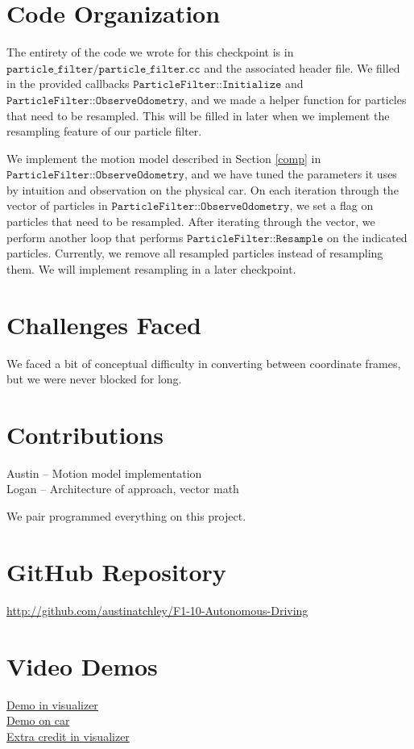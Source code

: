 \section{Code Organization}
The entirety of the code we wrote for this checkpoint is in $\texttt{particle\_filter/particle\_filter.cc}$ and the associated header file. We filled in the provided callbacks $\texttt{ParticleFilter::Initialize}$ and
$\texttt{ParticleFilter::ObserveOdometry}$, and we made a helper function for particles that need to be resampled. This will be filled in later when we implement the resampling feature of our particle filter.

We implement the motion model described in Section \ref{comp} in $\texttt{ParticleFilter::ObserveOdometry}$, and we have tuned the parameters it uses by intuition and observation on the physical car. On each iteration through the vector of particles in $\texttt{ParticleFilter::ObserveOdometry}$, we set a flag on particles that need to be resampled. After iterating through the vector, we perform another loop that performs $\texttt{ParticleFilter::Resample}$ on the indicated particles. Currently, we remove all resampled particles instead of resampling them. We will implement resampling in a later checkpoint.


\section{Challenges Faced}
We faced a bit of conceptual difficulty in converting between coordinate frames, but we were never blocked for long.


\section{Contributions}
Austin -- Motion model implementation\\
Logan -- Architecture of approach, vector math

\hfill \break
We pair programmed everything on this project.


\section{GitHub Repository}
\url{http://github.com/austinatchley/F1-10-Autonomous-Driving}


\section{Video Demos}
\href{https://drive.google.com/open?id=1znc63PhqySLQFec6sGqk9LTC95YbCcTg}{Demo in visualizer} \\ 
\href{https://photos.app.goo.gl/bFCGwkKLFGnqaPvr5}{Demo on car}\\
\href{https://drive.google.com/file/d/1dLPc_b5GYV3OAEe9qSnnM5QjDSqa-gy0/view?usp=sharing}{Extra credit in visualizer}



